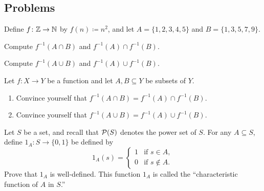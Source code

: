 \documentclass[../notes.tex]{subfiles}
\begin{document}
\subsection{Problems}
\begin{homework}
    Define $f\colon\mathbb Z\to\mathbb N$ by $f(n)\coloneqq n^2$, and let $A=\{1,2,3,4,5\}$ and $B=\{1,3,5,7,9\}$.
    \begin{listalph}
        \item Compute $f^{-1}(A\cap B)$ and $f^{-1}(A)\cap f^{-1}(B)$.
        \item Compute $f^{-1}(A\cup B)$ and $f^{-1}(A)\cup f^{-1}(B)$.
    \end{listalph}
\end{homework}
\begin{homework}
    Let $f\colon X\to Y$ be a function and let $A,B\subseteq Y$ be subsets of $Y$.
    \begin{enumerate}[label=(\alph*)]
        \item Convince yourself that $f^{-1}(A\cap B)=f^{-1}(A)\cap f^{-1}(B)$.
        \item Convince yourself that $f^{-1}(A\cup B)=f^{-1}(A)\cup f^{-1}(B)$.
    \end{enumerate}
\end{homework}
\begin{homework}
    Let $S$ be a set, and recall that $\mathcal{P}(S)$ denotes the power set of $S$. For any $A \subseteq S$, define $1_A\colon S \to \{0, 1\}$ be defined by
    \[1_A(s) = \begin{cases} 1 & \text{if }s \in A, \\ 0 & \text{if }s \notin A.\end{cases}\]
    Prove that $1_A$ is well-defined. This function $1_A$ is called the ``characteristic function of $A$ in $S$.''
\end{homework}
\end{document}
